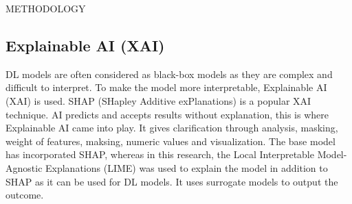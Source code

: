 \begin{section}[]{\uppercase{Methodology}}
\subsection{Explainable AI (XAI)}
DL models are often considered as black-box models as they are complex and difficult to interpret. To make the model more interpretable, Explainable AI (XAI) is used. SHAP (SHapley Additive exPlanations) is a popular XAI technique. AI predicts and accepts results without explanation, this is where Explainable AI came into play. It gives clarification through analysis, masking, weight of features, maksing, numeric values and visualization.
The base model has incorporated SHAP, whereas in this research, the Local Interpretable Model-Agnostic Explanations (LIME) was used to explain the model in addition to SHAP as it can be used for DL models. It uses surrogate models to output the outcome. 

\end{section}

\pagebreak
